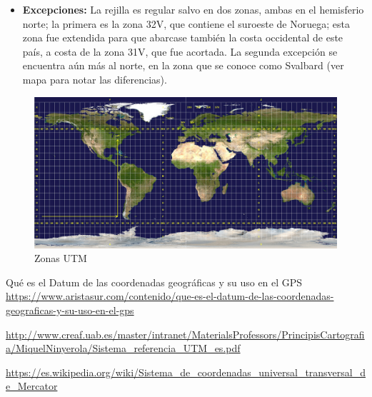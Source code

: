 \begin{itemize}
\item \textbf{Excepciones:}  La rejilla es regular salvo en dos zonas, ambas en el hemisferio
  norte; la primera es la zona 32V, que contiene el suroeste de
  Noruega; esta zona fue extendida para que abarcase también la costa
  occidental de este país, a costa de la zona 31V, que fue
  acortada. La segunda excepción se encuentra aún más al norte, en la
  zona que se conoce como Svalbard (ver mapa para notar las
  diferencias).
\end{itemize}


\begin{figure}[!htb]
  \centering
  \includegraphics[width=\textwidth]{06.radionavegacion/Imagenes/Utm-zones.jpg}
  \caption{Zonas UTM}
  \label{fig:zonas.utm}
\end{figure}

Qué es el Datum de las coordenadas geográficas y su uso en el GPS
\url{https://www.aristasur.com/contenido/que-es-el-datum-de-las-coordenadas-geograficas-y-su-uso-en-el-gps}

\url{http://www.creaf.uab.es/master/intranet/MaterialsProfessors/PrincipisCartografia/MiquelNinyerola/Sistema_referencia_UTM_es.pdf}

\url{https://es.wikipedia.org/wiki/Sistema_de_coordenadas_universal_transversal_de_Mercator}